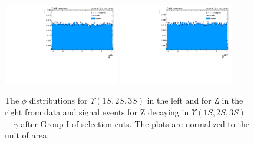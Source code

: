 \begin{figure}[!htbp]
\begin{center}
\includegraphics[width=0.45\textwidth]{figures_and_tables/outputPlots/ZtoUpsilon_Cat0_ZZZZZ/au/data_x_mc/noKinCuts/h_noKin_Upsilon_phi}\hspace*{1.cm}
\includegraphics[width=0.45\textwidth]{figures_and_tables/outputPlots/ZtoUpsilon_Cat0_ZZZZZ/au/data_x_mc/noKinCuts/h_noKin_Z_phi}
\end{center}\vspace*{-.5cm}
\caption{The $\phi$ distributions for $\Upsilon(1S,2S,3S)$ in the left and for Z in the right from data and signal events for Z decaying in $\Upsilon(1S,2S,3S)$ + $\gamma$ after Group I of selection cuts. The plots are normalized to the unit of area.}
\label{fig:phiUpsilon_and_Z_ZtoUpsilon_Cat0}
\end{figure}


